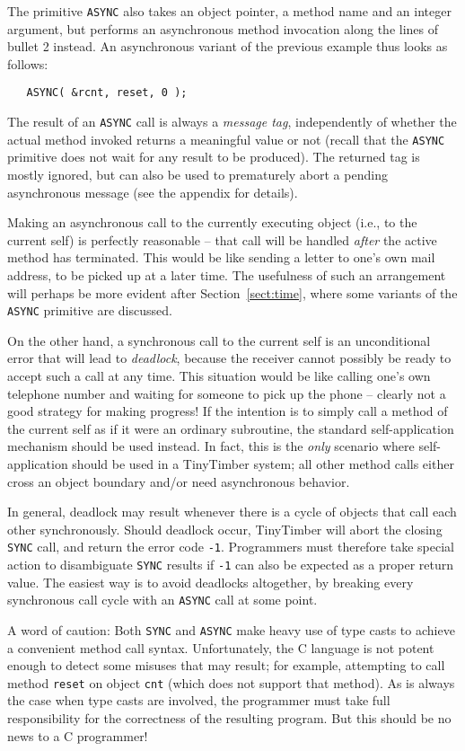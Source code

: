 \documentclass[12pt]{article}
\begin{document}
The primitive {\tt ASYNC} also takes an object pointer, a method name and an integer argument, but performs an asynchronous method invocation along the lines of bullet 2 instead.  An asynchronous variant of the previous example thus looks as follows:
\begin{verbatim}
   ASYNC( &rcnt, reset, 0 );
\end{verbatim}
The result of an {\tt ASYNC} call is always a {\em message tag}, independently of whether the actual method invoked returns a meaningful value or not (recall that the {\tt ASYNC} primitive does not wait for any result to be produced).  The returned tag is mostly ignored, but can also be used to prematurely abort a pending asynchronous message (see the appendix for details).

Making an asynchronous call to the currently executing object (i.e., to the current self) is perfectly reasonable -- that call will be handled {\em after} the active method has terminated.  This would be like sending a letter to one's own mail address, to be picked up at a later time.  The usefulness of such an arrangement will perhaps be more evident after Section~\ref{sect:time}, where some variants of the {\tt ASYNC} primitive are discussed.

On the other hand, a synchronous call to the current self is an unconditional error that will lead to {\em deadlock}, because the receiver cannot possibly be ready to accept such a call at any time.  This situation would be like calling one's own telephone number and waiting for someone to pick up the phone -- clearly not a good strategy for making progress!  If the intention is to simply call a method of the current self as if it were an ordinary subroutine, the standard self-application mechanism should be used instead.  In fact, this is the {\em only} scenario where self-application should be used in a TinyTimber system; all other method calls either cross an object boundary and/or need asynchronous behavior.

In general, deadlock may result whenever there is a cycle of objects that call each other synchronously.  Should deadlock occur, TinyTimber will abort the closing {\tt SYNC} call, and return the error code {\tt -1}.  Programmers must therefore take special action to disambiguate {\tt SYNC} results if {\tt -1} can also be expected as a proper return value.  The easiest way is to avoid deadlocks altogether, by breaking every synchronous call cycle with an {\tt ASYNC} call at some point.

A word of caution: Both {\tt SYNC} and {\tt ASYNC} make heavy use of type casts to achieve a convenient method call syntax.  Unfortunately, the C language is not potent enough to detect some misuses that may result; for example, attempting to call method {\tt reset} on object {\tt cnt} (which does not support that method).  As is always the case when type casts are involved, the programmer must take full responsibility for the correctness of the resulting program.  But this should be no news to a C programmer!
\end{document}
